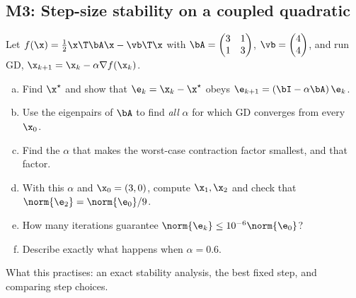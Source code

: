 \subsection{M3: Step-size stability on a coupled quadratic}

\begin{frame}{}
  \begin{probbox}
    Let $f(\x) = \tfrac12\x\T\bA\x - \vb\T\x$ with
    $\bA = \begin{pmatrix}3&1\\1&3\end{pmatrix}$, $\vb = \begin{pmatrix}4\\4\end{pmatrix}$,
    and run GD, $\x_{k+1} = \x_k - \alpha\nabla f(\x_k)$.
    \begin{enumerate}[(a)]
      \item Find $\x^\star$ and show that $\e_k = \x_k - \x^\star$ obeys $\e_{k+1} = (\bI - \alpha\bA)\,\e_k$.
      \item Use the eigenpairs of $\bA$ to find \emph{all} $\alpha$ for which GD converges from every $\x_0$.
      \item Find the $\alpha$ that makes the worst-case contraction factor smallest, and that factor.
      \item With this $\alpha$ and $\x_0 = (3,0)$, compute $\x_1,\x_2$ and check that $\norm{\e_2} = \norm{\e_0}/9$.
      \item How many iterations guarantee $\norm{\e_k}\le 10^{-6}\norm{\e_0}$?
      \item Describe exactly what happens when $\alpha = 0.6$.
    \end{enumerate}
  \end{probbox}
  \footnotesize\textcolor{mGrey}{What this practises: an exact stability analysis, the best fixed step, and comparing step choices.}
\end{frame}

